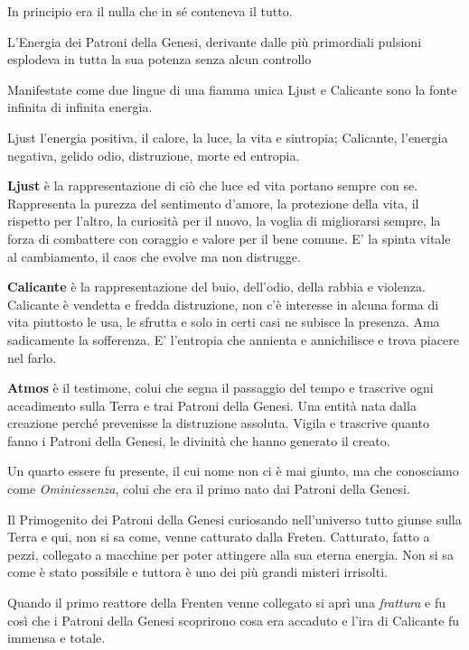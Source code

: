 \begin{multicols}{2}

In principio era il nulla che in sé conteneva il tutto.

L'Energia dei Patroni della Genesi, derivante dalle più primordiali pulsioni esplodeva in tutta la sua potenza senza alcun controllo

Manifestate come due lingue di una fiamma unica Ljust e Calicante sono la fonte infinita di infinita energia.

Ljust l'energia positiva, il calore, la luce, la vita e sintropia; Calicante, l'energia negativa, gelido odio, distruzione, morte ed entropia.

\textbf{Ljust} è la rappresentazione di ciò che luce ed vita portano sempre con se. Rappresenta la purezza del sentimento d'amore, la protezione della vita, il rispetto per l'altro, la curiosità per il nuovo, la voglia di migliorarsi sempre, la forza di combattere con coraggio e valore per il bene comune. E' la spinta vitale al cambiamento, il caos che evolve ma non distrugge.

\textbf{Calicante} è la rappresentazione del buio, dell'odio, della rabbia e violenza. Calicante è vendetta e fredda distruzione, non c'è interesse in alcuna forma di vita piuttosto le usa, le sfrutta e solo in certi casi ne subisce la presenza. Ama sadicamente la sofferenza. E' l'entropia che annienta e annichilisce e trova piacere nel farlo.

\textbf{Atmos} è il testimone, colui che segna il passaggio del tempo e trascrive ogni accadimento sulla Terra e trai Patroni della Genesi. Una entità nata dalla creazione perché prevenisse la distruzione assoluta. Vigila e trascrive quanto fanno i Patroni della Genesi, le divinità che hanno generato il creato.

Un quarto essere fu presente, il cui nome non ci è mai giunto, ma che conosciamo come \emph{Ominiessenza}, colui che era il primo nato dai Patroni della Genesi.

Il Primogenito dei Patroni della Genesi curiosando nell'universo tutto giunse sulla Terra e qui, non si sa come, venne catturato dalla Freten.
Catturato, fatto a pezzi, collegato a macchine per poter attingere alla sua eterna energia. Non si sa come è stato possibile e tuttora è uno dei più grandi misteri irrisolti.

Quando il primo reattore della Frenten venne collegato si aprì una \emph{frattura} e fu così che i Patroni della Genesi scoprirono cosa era accaduto e l'ira di Calicante fu immensa e totale.


\end{multicols}
